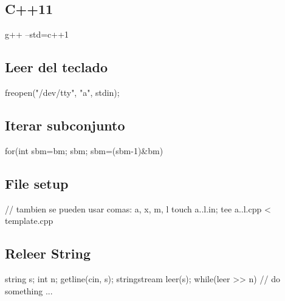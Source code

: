 \subsection*{C++11}
\begin{code}
g++ --std=c++1
\end{code}
\subsection*{Leer del teclado}
\begin{code}
freopen("/dev/tty", "a", stdin);
\end{code}
\subsection*{Iterar subconjunto}
\begin{code}
for(int sbm=bm; sbm; sbm=(sbm-1)&bm)
\end{code}
\subsection*{File setup}
\begin{code}
// tambien se pueden usar comas: {a, x, m, l}
touch {a..l}.in; tee {a..l}.cpp < template.cpp
\end{code}
\subsection*{Releer String}
\begin{code}
string s; int n;
getline(cin, s);
stringstream leer(s);
while(leer >> n){
	// do something ...
}
\end{code}


